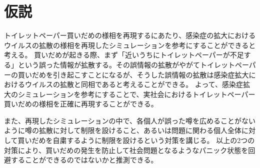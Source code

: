 \section{仮説}
トイレットペーパー買いだめの様相を再現するにあたり、感染症の拡大におけるウイルスの拡散の様相を再現したシミュレーションを参考にすることができると考える。
買いだめが起きる際、まず「近いうちにトイレットペーパーが不足する」という誤った情報が拡散する。その誤情報の拡散がやがてトイレットペーパーの買いだめを引き起こすことになるが、そうした誤情報の拡散は感染症拡大におけるウイルスの拡散と同相であると考えることができる。
よって、感染症拡大のシミュレーションを参考にすることで、実社会におけるトイレットペーパー買いだめの様相を正確に再現することができる。

また、再現したシミュレーションの中で、各個人が誤った噂を広めることがないように噂の拡散に対して制限を設けること、あるいは問題に関わる個人全体に対して買いだめを自粛するように制限を設けるという対策を講じる。
以上の2つの対策により、買いだめの発生を防止して社会問題となるようなパニック状態を回避することができるのではないかと推測できる。


